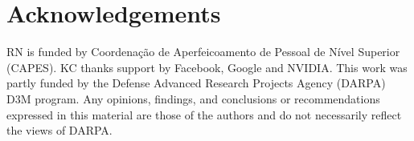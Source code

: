 \documentclass[11pt,letterpaper]{article}
\begin{document}
\section*{Acknowledgements} 

RN is funded by Coordenação de Aperfeicoamento de Pessoal de Nível Superior (CAPES). KC thanks support by Facebook, Google and NVIDIA. This work was partly funded by the Defense Advanced Research Projects Agency (DARPA) D3M program. Any opinions, findings, and conclusions or recommendations expressed in this material are those of the authors and do not necessarily reflect the views of DARPA. 



\end{document}
